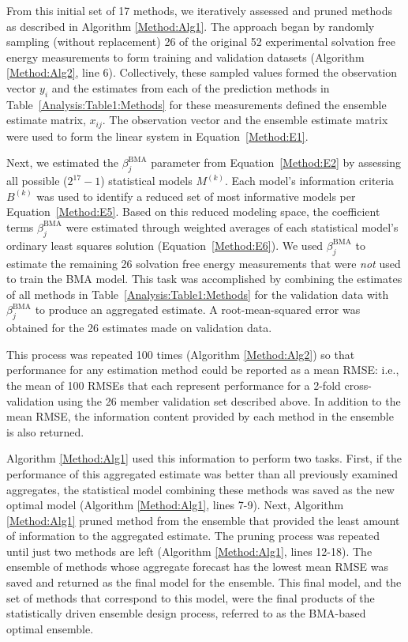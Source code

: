 \documentclass[journal=jpcbfk, manuscript=article]{achemso}
\newcommand{\+}[1]{\ensuremath{\mathbf{#1}}}
\begin{document}
From this initial set of 17 methods, we iteratively assessed and pruned methods as described in Algorithm \ref{Method:Alg1}.
The approach began by randomly sampling (without replacement) 26 of the original 52 experimental solvation free energy measurements to form training and validation datasets (Algorithm \ref{Method:Alg2}, line 6).
Collectively, these sampled values formed the observation vector $y_i$ and the estimates from each of the prediction methods in Table~\ref{Analysis:Table1:Methods} for these measurements defined the ensemble estimate matrix, $x_{i j}$.
The observation vector and the ensemble estimate matrix were used to form the linear system in Equation~\ref{Method:E1}.  

Next, we estimated the $\beta_j^{\text{BMA}}$ parameter from Equation~\ref{Method:E2} by assessing all possible ($2^{17} -1$) statistical models $M^{(k)}$.
Each model's information criteria $B^{(k)}$ was used to identify a reduced set of most informative models per Equation~\ref{Method:E5}.
Based on this reduced modeling space, the coefficient terms $\beta_j^{\text{BMA}}$ were estimated through weighted averages of each statistical model's ordinary least squares solution (Equation~\ref{Method:E6}).
We used $\beta_j^{\text{BMA}}$ to estimate the remaining 26 solvation free energy measurements that were \emph{not} used to train the BMA model.
This task was accomplished by combining the estimates of all methods in Table~\ref{Analysis:Table1:Methods} for the validation data with $\beta_j^{\text{BMA}}$ to produce an aggregated estimate. 
A root-mean-squared error was obtained for the 26 estimates made on validation data.

This process was repeated 100 times (Algorithm \ref{Method:Alg2}) so that performance for any estimation method could be reported as a mean RMSE: i.e., the mean of 100 RMSEs that each represent performance for a 2-fold cross-validation using the 26 member validation set described above.
In addition to the mean RMSE, the information content provided by each method in the ensemble is also returned. 

Algorithm \ref{Method:Alg1} used this information to perform two tasks.
First, if the performance of this aggregated estimate was better than all previously examined aggregates, the statistical model combining these methods was saved as the new optimal model (Algorithm \ref{Method:Alg1}, lines 7-9).
Next, Algorithm \ref{Method:Alg1} pruned method from the ensemble that provided the least amount of information to the aggregated estimate.
The pruning process was repeated until just two methods are left (Algorithm \ref{Method:Alg1}, lines 12-18).
The ensemble of methods whose aggregate forecast has the lowest mean RMSE was saved and returned as the final model for the ensemble.
This final model, and the set of methods that correspond to this model, were the final products of the statistically driven ensemble design process, referred to as the BMA-based optimal ensemble.
\end{document}
